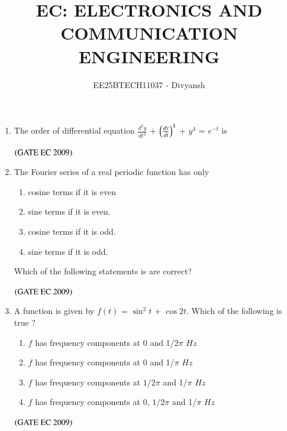 \documentclass[journal,12pt,onecolumn]{IEEEtran}
\title{EC: ELECTRONICS AND COMMUNICATION ENGINEERING}
\author{EE25BTECH11037 - Divyansh}
\theoremstyle{remark}
\begin{document}
\maketitle

\begin{enumerate}[start=1, label={Q\arabic*.}]

\item The order of differential equation  $\frac{d^2y}{dt^2}$ + $\left(\frac{dy}{dt}\right)^3$ + $y^4$ = $e^{-t}$ is
\begin{enumerate}
\end{enumerate}
\hfill $\left(\text{GATE EC 2009}\right)$

\item The Fourier series of a real periodic function has only 
\begin{enumerate}
\item cosine terms if it is even
\item sine terms if it is even. 
\item cosine terms if it is odd.
\item sine terms if it is odd.
\end{enumerate}
Which of the following statements is are correct?
\begin{enumerate}
\end{enumerate}
\hfill $\left(\text{GATE EC 2009}\right)$

\item A function is given by $f(t)$ = $\sin^2t$ + $\cos2t$. Which of the following is true ?

\begin{enumerate}
    \item $f$ has frequency components at $0$ and 1/2$\pi$  $Hz $
    \item $f$ has frequency components at $0$ and 1/$\pi$  $Hz $
    \item $f$ has frequency components at $1/2$$\pi$ and 1/$\pi$ $  Hz$ 
    \item $f$ has frequency components at $0$, $1/2$$\pi$ and 1/$\pi$ $ Hz$ 
\end{enumerate}
\hfill $\left(\text{GATE EC 2009}\right)$


\end{enumerate}
\end{document}
